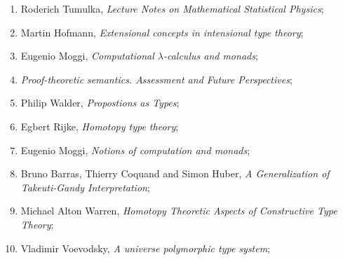 \documentclass[a4paper,11pt]{article}
\begin{document}
\begin{enumerate}
\item Roderich Tumulka, \emph{Lecture Notes on Mathematical
    Statistical Physics};

\item Martin Hofmann, \emph{Extensional concepts in intensional type
    theory};

\item Eugenio Moggi, \emph{Computational $\lambda$-calculus and monads};

\item \emph{Proof-theoretic semantics. Assessment and Future
    Perspectives};

\item Philip Walder, \emph{Propostions as Types};

\item Egbert Rijke, \emph{Homotopy type theory};

\item Eugenio Moggi, \emph{Notions of computation and monads};

\item Bruno Barras, Thierry Coquand and Simon Huber, \emph{A
    Generalization of Takeuti-Gandy Interpretation};

\item Michael Alton Warren, \emph{Homotopy Theoretic Aspects of
    Constructive Type Theory};

\item Vladimir Voevodsky, \emph{A universe polymorphic type system};


























\end{enumerate}











\end{document}

